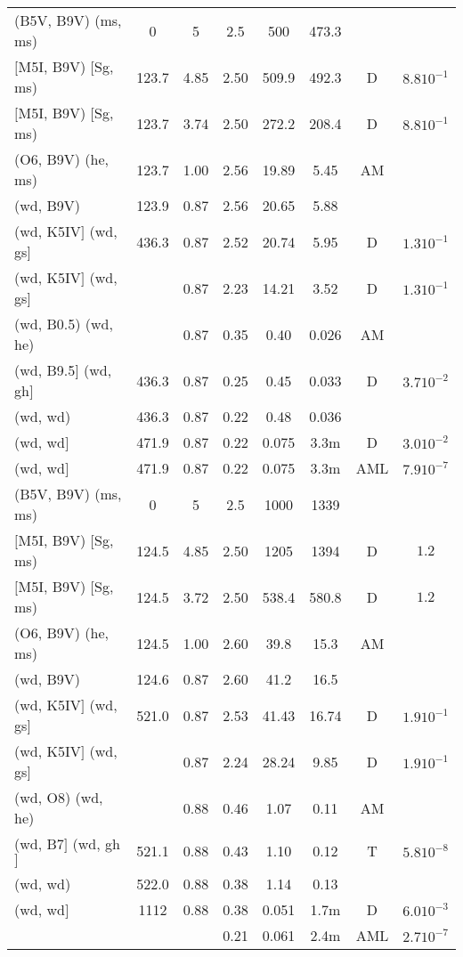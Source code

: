 \documentclass{article}
\begin{document}
\begin{table}
\begin{tabular}{p{4cm}ccccccc}
\hline
(B5V, B9V) (ms, ms)	& 0	& 5	& 2.5	& 500	& 473.3	&       &			\\
$[$M5I, B9V) $[$Sg, ms)	& 123.7	& 4.85	& 2.50	& 509.9	& 492.3	& D     & $8.8 10^{-1}$		\\
$[$M5I, B9V) $[$Sg, ms)	& 123.7	& 3.74	& 2.50	& 272.2	& 208.4	& D     & $8.8 10^{-1}$		\\
(O6, B9V) (he, ms)	& 123.7	& 1.00	& 2.56	& 19.89	& 5.45 	& AM    &               	\\
(wd, B9V)         	& 123.9	& 0.87	& 2.56	& 20.65	& 5.88 	&       &               	\\
(wd, K5IV$]$ (wd, gs$]$	& 436.3	& 0.87	& 2.52	& 20.74	& 5.95 	& D     & $1.3 10^{-1}$		\\
(wd, K5IV$]$ (wd, gs$]$	&      	& 0.87	& 2.23	& 14.21	& 3.52 	& D     & $1.3 10^{-1}$		\\
(wd, B0.5) (wd, he)	&      	& 0.87	& 0.35	& 0.40 	& 0.026	& AM    &              		\\
(wd, B9.5$]$ (wd, gh$]$	& 436.3	& 0.87	& 0.25	& 0.45 	& 0.033	& D     & $3.7 10^{-2}$		\\
(wd, wd)         	& 436.3	& 0.87	& 0.22	& 0.48 	& 0.036	&       &               	\\
(wd, wd$]$         	& 471.9	& 0.87	& 0.22	& 0.075	& 3.3m 	& D     & $3.0 10^{-2}$		\\
(wd, wd$]$         	& 471.9	& 0.87	& 0.22	& 0.075	& 3.3m 	& AML   & $7.9 10^{-7}$		\\
\hline
(B5V, B9V) (ms, ms)	& 0	& 5	& 2.5	& 1000	& 1339 	&       &			\\
$[$M5I, B9V) $[$Sg, ms)	& 124.5	& 4.85	& 2.50	& 1205	& 1394 	& D     & $1.2$			\\
$[$M5I, B9V) $[$Sg, ms)	& 124.5	& 3.72	& 2.50	& 538.4	& 580.8	& D     & $1.2$			\\
(O6, B9V) (he, ms)	& 124.5	& 1.00	& 2.60	& 39.8 	& 15.3 	& AM    &               	\\
(wd, B9V)         	& 124.6	& 0.87	& 2.60	& 41.2 	& 16.5 	&       &               	\\
(wd, K5IV$]$ (wd, gs$]$	& 521.0	& 0.87	& 2.53	& 41.43	& 16.74	& D     & $1.9 10^{-1}$		\\
(wd, K5IV$]$ (wd, gs$]$	&      	& 0.87	& 2.24	& 28.24	& 9.85 	& D     & $1.9 10^{-1}$		\\
(wd, O8) (wd, he)	&      	& 0.88	& 0.46	& 1.07 	& 0.11 	& AM    &              		\\
(wd, B7$]$ (wd, gh$]$	& 521.1	& 0.88	& 0.43	& 1.10 	& 0.12 	& T     & $5.8 10^{-8}$		\\
(wd, wd)         	& 522.0	& 0.88	& 0.38	& 1.14 	& 0.13 	&       &              		\\
(wd, wd$]$         	& 1112 	& 0.88	& 0.38	& 0.051	& 1.7m 	& D     & $6.0 10^{-3}$		\\
			&	& 	& 0.21	& 0.061	& 2.4m	& AML   & $2.7 10^{-7}$		\\ 
\hline
\end{tabular}
\end{table}
\end{document}
